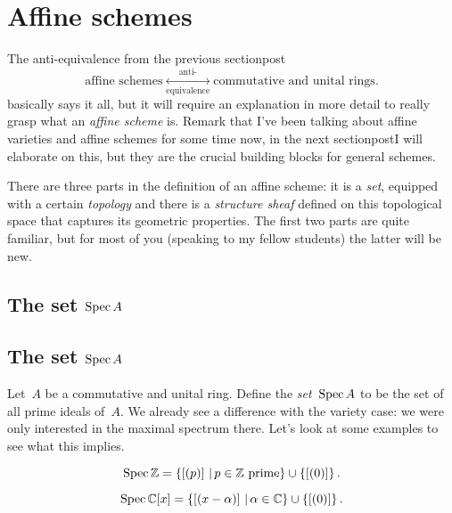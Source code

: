 \section{Affine schemes}
The anti-equivalence from the previous \iftex section\fi\ifblog post\fi
\begin{equation}
  \text{affine schemes} \underset{\text{equivalence}}{\overset{\text{anti-}}{\longleftrightarrow}} \text{commutative and unital rings}.
  \label{equation:schemes-anti-equivalence-2}
\end{equation}
basically says it all, but it will require an explanation in more detail to really grasp what an \emph{affine scheme} is. Remark that I've been talking about affine varieties and affine schemes for some time now, in the next \iftex section\fi\ifblog post\fi I will elaborate on this, but they are the crucial building blocks for general schemes.

There are three parts in the definition of an affine scheme: it is a \emph{set}, equipped with a certain \emph{topology} and there is a \emph{structure sheaf} defined on this topological space that captures its geometric properties. The first two parts are quite familiar, but for most of you (speaking to my fellow students) the latter will be new.

\iftex
\subsection[The set Spec A]{The set $\operatorname{Spec} A$}
\fi
\ifblog
\subsection{The set $\operatorname{Spec} A$}
\fi
Let~$A$ be a commutative and unital ring. Define the \emph{set~$\operatorname{Spec} A$} to be the set of all prime ideals of~$A$. We already see a difference with the variety case: we were only interested in the maximal spectrum there. Let's look at some examples to see what this implies.

\begin{example}
  \begin{equation}
    \operatorname{Spec}\mathbb{Z}=\left\{ \left[ (p) \right]\,|\,\text{$p\in\mathbb{Z}$ prime} \right\}\cup\left\{ [(0)] \right\}.
  \end{equation}
\end{example}

\begin{example}
  \begin{equation}
    \operatorname{Spec}\mathbb{C}[x]=\left\{ \left[ (x-\alpha) \right]\,|\,\alpha\in\mathbb{C} \right\}\cup\left\{ [(0)] \right\}.
  \end{equation}
\end{example}

